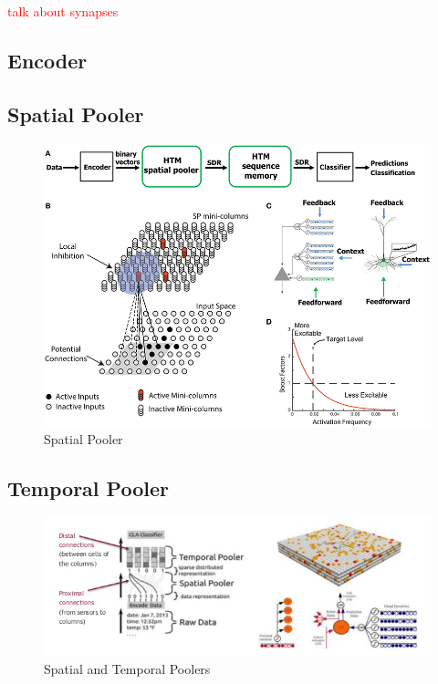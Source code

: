 \documentclass[oneside,12pt,openany]{book}
\begin{document}
	\textcolor{red}{talk about synapses}
	
	\subsection{Encoder}
	
	\subsection{Spatial Pooler}
	
	\begin{figure}[h!]
		\centering
		\includegraphics[width=\linewidth]{images/SpatialPooler.jpg}
		\caption[Spatial Pooler]{Spatial Pooler \cite{TheHTMSpatialPooler}}
		\label{fig:SpatialPooler}
	\end{figure}
	
	\subsection{Temporal Pooler}


	\begin{figure}[h!]
		\centering
		\includegraphics[width=\linewidth]{images/Poolers.jpg}
		\caption{Spatial and Temporal Poolers}
		\label{fig:Poolers}
	\end{figure}
\end{document}
